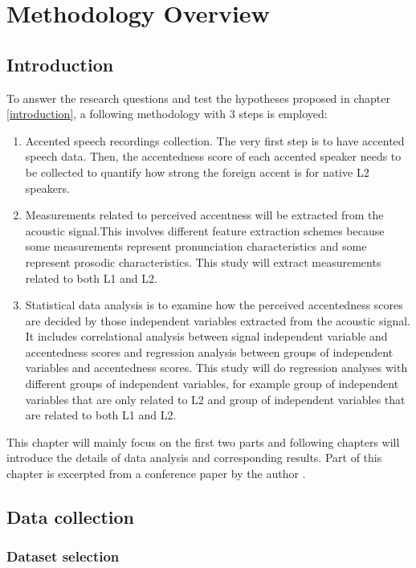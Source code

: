 \chapter{Methodology Overview}
\label{sec:methodology}
\section{Introduction}
To answer the research questions and test the hypotheses proposed in chapter \ref{introduction}, a following methodology with 3 steps is employed:
\begin{enumerate}
\item Accented speech recordings collection. The very first step is to have accented speech data. Then, the accentedness score of each accented speaker needs to be collected to quantify how strong the foreign accent is for native L2 speakers.
\item Measurements related to perceived accentness will be extracted from the acoustic signal.This involves different feature extraction schemes because some measurements represent pronunciation characteristics and some represent prosodic characteristics. This study will extract measurements related to both L1 and L2.
\item Statistical data analysis is to examine how the perceived accentedness scores are decided by those independent variables extracted from the acoustic signal. It includes correlational analysis between signal independent variable and accentedness scores and regression analysis between groups of independent variables and accentedness scores. This study will do regression analyses with different groups of independent variables, for example group of independent variables that are only related to L2 and group of independent variables that are related to both L1 and L2.
\end{enumerate}
This chapter will mainly focus on the first two parts and following chapters will introduce the details of data analysis and corresponding results. Part of this chapter is excerpted from a conference paper by the author \citep{tu2018investigating}.

\section{Data collection}

\label{sec:data_collection}

\subsection{Dataset selection}

